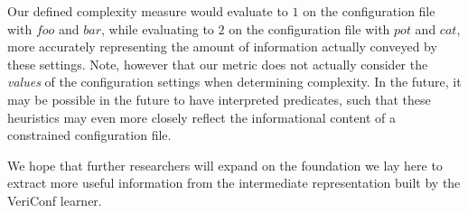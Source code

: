 Our defined complexity measure would evaluate to $1$ on the
configuration file with $foo$ and $bar$, while evaluating to $2$ on
the configuration file with $pot$ and $cat$, more accurately representing
the amount of information actually conveyed by these settings. Note,
however that our metric does not actually consider the {\it values}
of the configuration settings when determining complexity. In the
future, it may be possible in the future to have interpreted predicates,
such that these heuristics may even more closely reflect the informational
content of a constrained configuration file.

We hope that further researchers will expand on the foundation we lay
here to extract more useful information from the intermediate
representation built by the VeriConf learner.

\iffalse

it may be possible in the future to have interpreted predicates,
such that these heuristics may more accurately reflect the informational
content of a constrained configuration file.

Use the listing in figure 2 to put together an example of why the
naive implementation of complexity doesn't give as much of an idea
of what is going on as our heuristic.

Additional refinement of a complexity metric could take into account
when learned rules are violated (indicating potentially brittle
configuration state)

\fi





